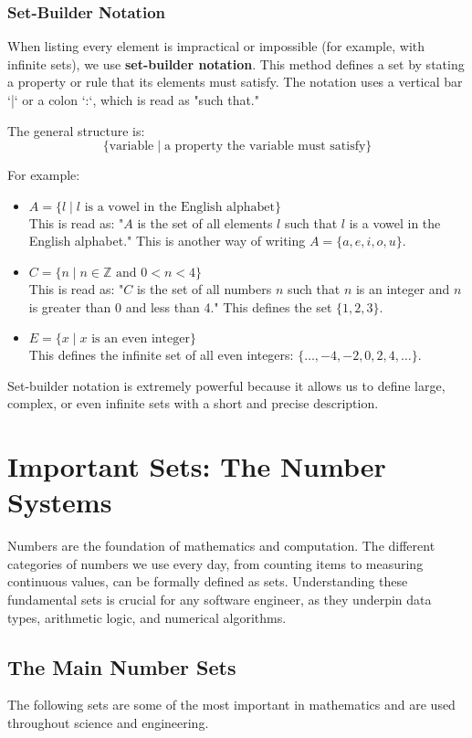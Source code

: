 \subsubsection*{Set-Builder Notation}
When listing every element is impractical or impossible (for example, with infinite sets), we use \textbf{set-builder notation}. This method defines a set by stating a property or rule that its elements must satisfy. The notation uses a vertical bar `|` or a colon `:`, which is read as "such that."

The general structure is:
\[ \{ \text{variable} \mid \text{a property the variable must satisfy} \} \]

For example:
\begin{itemize}
    \item $A = \{ l \mid l \text{ is a vowel in the English alphabet} \}$ \\
    This is read as: "$A$ is the set of all elements $l$ such that $l$ is a vowel in the English alphabet." This is another way of writing $A = \{a, e, i, o, u\}$.
    
    \item $C = \{ n \mid n \in \mathbb{Z} \text{ and } 0 < n < 4 \}$ \\
    This is read as: "$C$ is the set of all numbers $n$ such that $n$ is an integer and $n$ is greater than 0 and less than 4." This defines the set $\{1, 2, 3\}$.
    
    \item $E = \{ x \mid x \text{ is an even integer} \}$ \\
    This defines the infinite set of all even integers: $\{\dots, -4, -2, 0, 2, 4, \dots\}$.
\end{itemize}

Set-builder notation is extremely powerful because it allows us to define large, complex, or even infinite sets with a short and precise description.

\section{Important Sets: The Number Systems}
Numbers are the foundation of mathematics and computation. The different categories of numbers we use every day, from counting items to measuring continuous values, can be formally defined as sets. Understanding these fundamental sets is crucial for any software engineer, as they underpin data types, arithmetic logic, and numerical algorithms.

\subsection*{The Main Number Sets}
The following sets are some of the most important in mathematics and are used throughout science and engineering.


